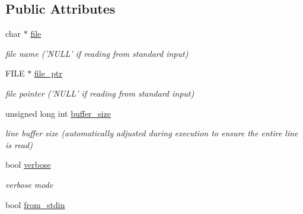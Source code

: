 \subsection*{Public Attributes}
\begin{CompactItemize}
\item 
\hypertarget{classGenomicRegionSet_7c593d1beab775590d5b810097644583}{
char $\ast$ \hyperlink{classGenomicRegionSet_7c593d1beab775590d5b810097644583}{file}}
\label{classGenomicRegionSet_7c593d1beab775590d5b810097644583}

\begin{CompactList}\small\item\em file name ('NULL' if reading from standard input) \item\end{CompactList}\item 
\hypertarget{classGenomicRegionSet_4ca6c6268e39fdea2add6e6381c66962}{
FILE $\ast$ \hyperlink{classGenomicRegionSet_4ca6c6268e39fdea2add6e6381c66962}{file\_\-ptr}}
\label{classGenomicRegionSet_4ca6c6268e39fdea2add6e6381c66962}

\begin{CompactList}\small\item\em file pointer ('NULL' if reading from standard input) \item\end{CompactList}\item 
\hypertarget{classGenomicRegionSet_4d60b5403d2d6aaeda541ed45625b245}{
unsigned long int \hyperlink{classGenomicRegionSet_4d60b5403d2d6aaeda541ed45625b245}{buffer\_\-size}}
\label{classGenomicRegionSet_4d60b5403d2d6aaeda541ed45625b245}

\begin{CompactList}\small\item\em line buffer size (automatically adjusted during execution to ensure the entire line is read) \item\end{CompactList}\item 
\hypertarget{classGenomicRegionSet_2646e9e6d5da1693b4bea36a5acc082e}{
bool \hyperlink{classGenomicRegionSet_2646e9e6d5da1693b4bea36a5acc082e}{verbose}}
\label{classGenomicRegionSet_2646e9e6d5da1693b4bea36a5acc082e}

\begin{CompactList}\small\item\em verbose mode \item\end{CompactList}\item 
\hypertarget{classGenomicRegionSet_bd0fc2542e717e5855e03d3b3892f027}{
bool \hyperlink{classGenomicRegionSet_bd0fc2542e717e5855e03d3b3892f027}{from\_\-stdin}}
\label{classGenomicRegionSet_bd0fc2542e717e5855e03d3b3892f027}


\end{CompactItemize}
